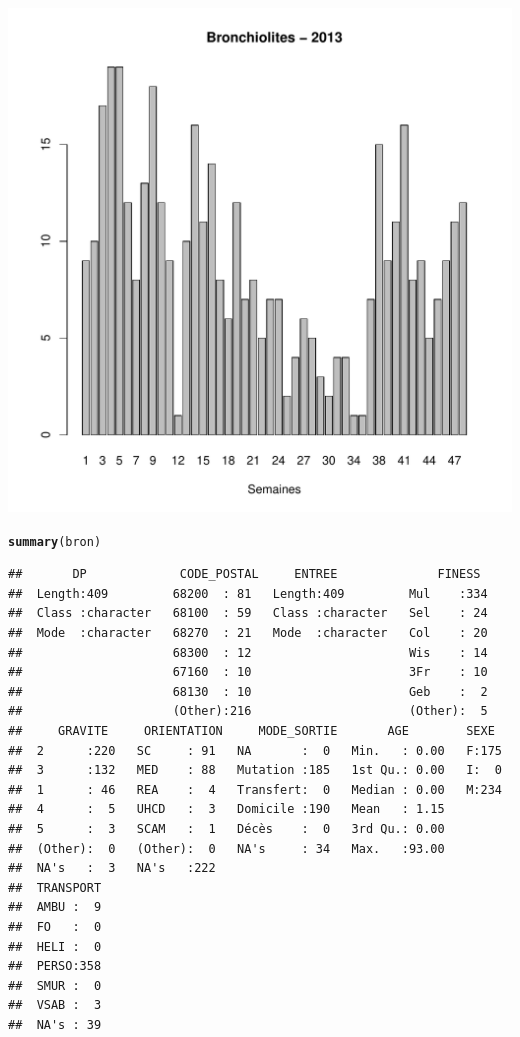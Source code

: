 \documentclass[12pt,english,french,twoside]{report}\usepackage[]{graphicx}\usepackage[]{color}
\makeatletter
\def\maxwidth{ %
  \ifdim\Gin@nat@width>\linewidth
    \linewidth
  \else
    \Gin@nat@width
  \fi
}
\newcommand{\hlstd}[1]{\textcolor[rgb]{0.345,0.345,0.345}{#1}}%
\newcommand{\hlkwd}[1]{\textcolor[rgb]{0.737,0.353,0.396}{\textbf{#1}}}%
\newenvironment{kframe}{%
 \def\at@end@of@kframe{}%
 \ifinner\ifhmode%
  \def\at@end@of@kframe{\end{minipage}}%
  \begin{minipage}{\columnwidth}%
 \fi\fi%
 \def\FrameCommand##1{\hskip\@totalleftmargin \hskip-\fboxsep
 \colorbox{shadecolor}{##1}\hskip-\fboxsep
     \hskip-\linewidth \hskip-\@totalleftmargin \hskip\columnwidth}%
 \MakeFramed {\advance\hsize-\width
   \@totalleftmargin\z@ \linewidth\hsize
   \@setminipage}}%
 {\par\unskip\endMakeFramed%
 \at@end@of@kframe}
\newenvironment{knitrout}{}{} %
\makeatother
\begin{document}
\begin{knitrout}
\includegraphics[width=\maxwidth]{figure/bron2} 
\begin{kframe}\begin{alltt}
\hlkwd{summary}\hlstd{(bron)}
\end{alltt}
\begin{verbatim}
##       DP             CODE_POSTAL     ENTREE              FINESS   
##  Length:409         68200  : 81   Length:409         Mul    :334  
##  Class :character   68100  : 59   Class :character   Sel    : 24  
##  Mode  :character   68270  : 21   Mode  :character   Col    : 20  
##                     68300  : 12                      Wis    : 14  
##                     67160  : 10                      3Fr    : 10  
##                     68130  : 10                      Geb    :  2  
##                     (Other):216                      (Other):  5  
##     GRAVITE     ORIENTATION     MODE_SORTIE       AGE        SEXE   
##  2      :220   SC     : 91   NA       :  0   Min.   : 0.00   F:175  
##  3      :132   MED    : 88   Mutation :185   1st Qu.: 0.00   I:  0  
##  1      : 46   REA    :  4   Transfert:  0   Median : 0.00   M:234  
##  4      :  5   UHCD   :  3   Domicile :190   Mean   : 1.15          
##  5      :  3   SCAM   :  1   Décès    :  0   3rd Qu.: 0.00          
##  (Other):  0   (Other):  0   NA's     : 34   Max.   :93.00          
##  NA's   :  3   NA's   :222                                          
##  TRANSPORT  
##  AMBU :  9  
##  FO   :  0  
##  HELI :  0  
##  PERSO:358  
##  SMUR :  0  
##  VSAB :  3  
##  NA's : 39
\end{verbatim}
\end{kframe}
\end{knitrout}
\end{document}
